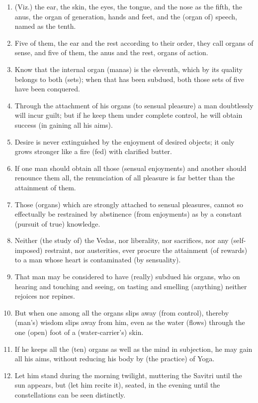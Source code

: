 \begin{enumerate}
\item (Viz.) the ear, the skin, the eyes, the tongue, and the nose as the fifth, the anus, the organ of generation, hands and feet, and the (organ of) speech, named as the tenth.
\item Five of them, the ear and the rest according to their order, they call organs of sense, and five of them, the anus and the rest, organs of action.
\item Know that the internal organ (manas) is the eleventh, which by its quality belongs to both (sets); when that has been subdued, both those sets of five have been conquered.
\item Through the attachment of his organs (to sensual pleasure) a man doubtlessly will incur guilt; but if he keep them under complete control, he will obtain success (in gaining all his aims).
\item Desire is never extinguished by the enjoyment of desired objects; it only grows stronger like a fire (fed) with clarified butter.
\item If one man should obtain all those (sensual enjoyments) and another should renounce them all, the renunciation of all pleasure is far better than the attainment of them.
\item Those (organs) which are strongly attached to sensual pleasures, cannot so effectually be restrained by abstinence (from enjoyments) as by a constant (pursuit of true) knowledge.
\item Neither (the study of) the Vedas, nor liberality, nor sacrifices, nor any (self-imposed) restraint, nor austerities, ever procure the attainment (of rewards) to a man whose heart is contaminated (by sensuality).
\item That man may be considered to have (really) subdued his organs, who on hearing and touching and seeing, on tasting and smelling (anything) neither rejoices nor repines.
\item But when one among all the organs slips away (from control), thereby (man's) wisdom slips away from him, even as the water (flows) through the one (open) foot of a (water-carrier's) skin.
\item If he keeps all the (ten) organs as well as the mind in subjection, he may gain all his aims, without reducing his body by (the practice) of Yoga.
\item Let him stand during the morning twilight, muttering the Savitri until the sun appears, but (let him recite it), seated, in the evening until the constellations can be seen distinctly.

\end{enumerate}
